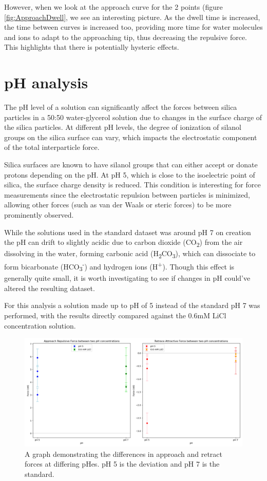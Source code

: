 However, when we look at the approach curve for the 2 points (figure \ref{fig:ApproachDwell}, we see an interesting picture. As the dwell time is increased, the time between curves is increased too, providing more time for water molecules and ions to adapt to the approaching tip, thus decreasing the repulsive force. This highlights that there is potentially hysteric effects.

\newpage
\section{pH analysis}

The pH level of a solution can significantly affect the forces between silica particles in a 50:50 water-glycerol solution due to changes in the surface charge of the silica particles. At different pH levels, the degree of ionization of silanol groups on the silica surface can vary, which impacts the electrostatic component of the total interparticle force. 

Silica surfaces are known to have silanol groups that can either accept or donate protons depending on the pH. At pH 5, which is close to the isoelectric point of silica, the surface charge density is reduced. This condition is interesting for force measurements since the electrostatic repulsion between particles is minimized, allowing other forces (such as van der Waals or steric forces) to be more prominently observed. \cite{Pavan2019}

While the solutions used in the standard dataset was around pH 7 on creation the pH can drift to slightly acidic due to carbon dioxide (CO\textsubscript{2}) from the air dissolving in the water, forming carbonic acid (H\textsubscript{2}CO\textsubscript{3}), which can dissociate to form bicarbonate (HCO\textsubscript{3}\textsuperscript{-}) and hydrogen ions (H\textsuperscript{+}). Though this effect is generally quite small, it is worth investigating to see if changes in pH could've altered the resulting dataset.

For this analysis a solution made up to pH of 5 instead of the standard pH 7 was performed, with the results directly compared against the 0.6mM LiCl concentration solution. 

\begin{figure}[h!]
\centering
\includegraphics[width=\textwidth]{chapter7/pH/Overall image.png}
\caption{A graph demonstrating the differences in approach and retract forces at differing pHes. pH 5 is the deviation and pH 7 is the standard.}
\label{fig:pHOverall}
\end{figure}


